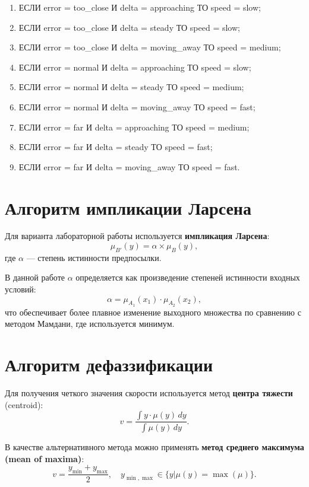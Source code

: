 \begin{enumerate}
    \item ЕСЛИ error = too\_close И delta = approaching ТО speed = slow;
    \item ЕСЛИ error = too\_close И delta = steady ТО speed = slow;
    \item ЕСЛИ error = too\_close И delta = moving\_away ТО speed = medium;
    \item ЕСЛИ error = normal И delta = approaching ТО speed = slow;
    \item ЕСЛИ error = normal И delta = steady ТО speed = medium;
    \item ЕСЛИ error = normal И delta = moving\_away ТО speed = fast;
    \item ЕСЛИ error = far И delta = approaching ТО speed = medium;
    \item ЕСЛИ error = far И delta = steady ТО speed = fast;
    \item ЕСЛИ error = far И delta = moving\_away ТО speed = fast.
\end{enumerate}

\section{Алгоритм импликации Ларсена}

Для варианта лабораторной работы используется \textbf{импликация Ларсена}:
\[
\mu_{B'}(y) = \alpha \times \mu_B(y),
\]
где \(\alpha\) — степень истинности предпосылки.

В данной работе \(\alpha\) определяется как произведение степеней истинности входных условий:
\[
\alpha = \mu_{A_1}(x_1) \cdot \mu_{A_2}(x_2),
\]
что обеспечивает более плавное изменение выходного множества по сравнению с методом Мамдани, где используется минимум.

\section{Алгоритм дефаззификации}

Для получения четкого значения скорости используется метод \textbf{центра тяжести} (centroid):
\[
v = \frac{\int y \cdot \mu(y) \, dy}{\int \mu(y) \, dy}.
\]

В качестве альтернативного метода можно применять \textbf{метод среднего максимума (mean of maxima)}:
\[
v = \frac{y_{\min} + y_{\max}}{2}, \quad y_{\min,\max} \in \{y | \mu(y) = \max(\mu)\}.
\]